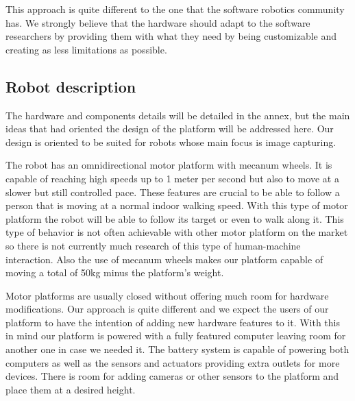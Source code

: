This approach is quite different to the one that the software robotics community has.
We strongly believe that the hardware should adapt to the software researchers by providing them with what they need by being customizable and creating as less limitations as possible.

%
\subsection{Robot description}
The hardware and components details will be detailed in the annex, but the main ideas that had oriented the design of the platform will be addressed here.
Our design is oriented to be suited for robots whose main focus is image capturing.

The robot has an omnidirectional motor platform with mecanum wheels.
It is capable of reaching high speeds up to 1 meter per second but also to move at a slower but still controlled pace.
These features are crucial to be able to follow a person that is moving at a normal indoor walking speed.
With this type of motor platform the robot will be able to follow its target or even to walk along it.
This type of behavior is not often achievable with other motor platform on the market so there is not currently much research of this type of human-machine interaction.
Also the use of mecanum wheels makes our platform capable of moving a total of 50kg minus the platform's weight.

Motor platforms are usually closed without offering much room for hardware modifications.
Our approach is quite different and we expect the users of our platform to have the intention of adding new hardware features to it.
With this in mind our platform is powered with a fully featured computer leaving room for another one in case we needed it.
The battery system is capable of powering both computers as well as the sensors and actuators providing extra outlets for more devices.
There is room for adding cameras or other sensors to the platform and place them at a desired height.

